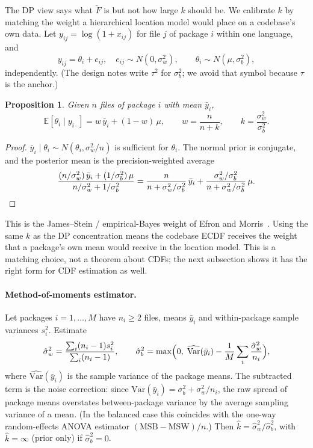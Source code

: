 \documentclass[11pt]{article}
\newtheorem{proposition}{Proposition}
\theoremstyle{remark}
\newcommand{\Ft}{\tilde F}
\begin{document}
The DP view says what $\Ft$ is but not how large $k$ should be. We calibrate
$k$ by matching the weight a hierarchical location model would place on a
codebase's own data. Let $y_{ij} = \log(1 + x_{ij})$ for file $j$ of package
$i$ within one language, and
\[
y_{ij} = \theta_i + e_{ij}, \quad e_{ij} \sim N(0, \sigma_w^2), \qquad
\theta_i \sim N(\mu, \sigma_b^2),
\]
independently. (The design notes write $\tau^2$ for $\sigma_b^2$; we avoid that
symbol because $\tau$ is the anchor.)

\begin{proposition}\label{prop:shrink}
Given $n$ files of package $i$ with mean $\bar y_i$,
\[
\mathbb E[\theta_i \mid y_{i\cdot}] = w\,\bar y_i + (1-w)\,\mu,
\qquad w = \frac{n}{n + k}, \qquad k = \frac{\sigma_w^2}{\sigma_b^2}.
\]
\end{proposition}

\begin{proof}
$\bar y_i \mid \theta_i \sim N(\theta_i, \sigma_w^2/n)$ is sufficient for
$\theta_i$. The normal prior is conjugate, and the posterior mean is the
precision-weighted average
\[
\frac{(n/\sigma_w^2)\,\bar y_i + (1/\sigma_b^2)\,\mu}{n/\sigma_w^2 + 1/\sigma_b^2}
= \frac{n}{n + \sigma_w^2/\sigma_b^2}\,\bar y_i
+ \frac{\sigma_w^2/\sigma_b^2}{n + \sigma_w^2/\sigma_b^2}\,\mu. \qedhere
\]
\end{proof}

This is the James--Stein / empirical-Bayes weight of Efron and
Morris~\cite{efron1975}. Using the same $k$ as the DP concentration means the
codebase ECDF receives the weight that a package's own mean would receive in
the location model. This is a matching choice, not a theorem about CDFs; the
next subsection shows it has the right form for CDF estimation as well.

\paragraph{Method-of-moments estimator.} Let packages $i = 1, \dots, M$ have
$n_i \ge 2$ files, means $\bar y_i$ and within-package sample variances $s_i^2$.
Estimate
\[
\hat\sigma_w^2 = \frac{\sum_i (n_i - 1) s_i^2}{\sum_i (n_i - 1)}, \qquad
\hat\sigma_b^2 = \max\Bigl(0,\; \widehat{\mathrm{Var}}(\bar y_i)
- \frac{1}{M}\sum_i \frac{\hat\sigma_w^2}{n_i}\Bigr),
\]
where $\widehat{\mathrm{Var}}(\bar y_i)$ is the sample variance of the package
means. The subtracted term is the noise correction: since
$\mathrm{Var}(\bar y_i) = \sigma_b^2 + \sigma_w^2/n_i$, the raw spread of
package means overstates between-package variance by the average sampling
variance of a mean. (In the balanced case this coincides with the one-way
random-effects ANOVA estimator $(\mathrm{MSB} - \mathrm{MSW})/n$.) Then
$\hat k = \hat\sigma_w^2/\hat\sigma_b^2$, with $\hat k = \infty$ (prior only)
if $\hat\sigma_b^2 = 0$.
\end{document}

